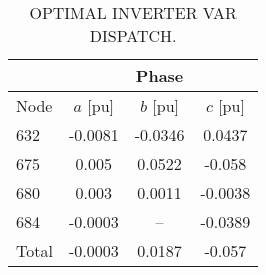 \begin{table}[h]
	\caption{OPTIMAL INVERTER VAR DISPATCH.}	
	\begin{center}
		\begin{tabular}{| l | c | c | c |}
        	\hline
        	& \multicolumn{3}{|c|}{Phase } \\
        	\hline
        	Node & $a$ [pu] & $b$ [pu] & $c$ [pu] \\
            \hline
            632 & -0.0081 & -0.0346 & 0.0437 \\
            \hline
            675 & 0.005 & 0.0522 & -0.058 \\
            \hline
            680 & 0.003 & 0.0011 & -0.0038 \\
            \hline
            684 & -0.0003 & -- & -0.0389 \\
            \hline
            Total & -0.0003 & 0.0187 & -0.057 \\
            \hline
		\end{tabular}
	\end{center}	
	\label{tab:unode}
\end{table}




